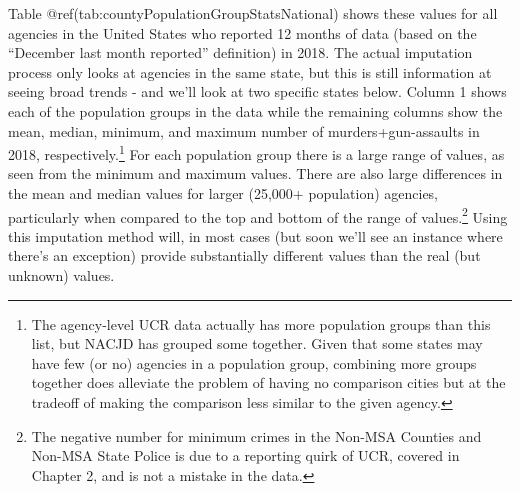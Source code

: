 \documentclass[
  12pt,
  openany]{book}
\begin{document}
Table @ref(tab:countyPopulationGroupStatsNational) shows these values for all agencies in the United States who reported 12 months of data (based on the ``December last month reported'' definition) in 2018. The actual imputation process only looks at agencies in the same state, but this is still information at seeing broad trends - and we'll look at two specific states below. Column 1 shows each of the population groups in the data while the remaining columns show the mean, median, minimum, and maximum number of murders+gun-assaults in 2018, respectively.\footnote{The agency-level UCR data actually has more population groups than this list, but NACJD has grouped some together. Given that some states may have few (or no) agencies in a population group, combining more groups together does alleviate the problem of having no comparison cities but at the tradeoff of making the comparison less similar to the given agency.} For each population group there is a large range of values, as seen from the minimum and maximum values. There are also large differences in the mean and median values for larger (25,000+ population) agencies, particularly when compared to the top and bottom of the range of values.\footnote{The negative number for minimum crimes in the Non-MSA Counties and Non-MSA State Police is due to a reporting quirk of UCR, covered in Chapter 2, and is not a mistake in the data.} Using this imputation method will, in most cases (but soon we'll see an instance where there's an exception) provide substantially different values than the real (but unknown) values.
\end{document}
